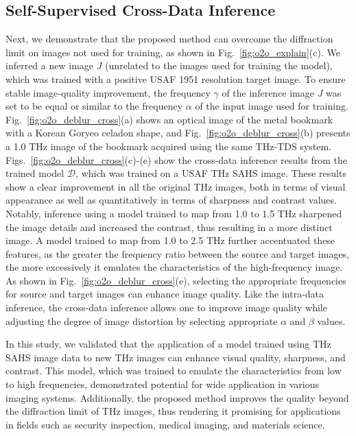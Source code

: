 \subsection{Self-Supervised Cross-Data Inference}
Next, we demonstrate that the proposed method can overcome the diffraction limit on images not used for training, as shown in Fig.~\ref{fig:o2o_explain}(c).
We inferred a new image $J$ (unrelated to the images used for training the model), which was trained with a positive USAF 1951 resolution target image. 
To ensure stable image-quality improvement, the frequency $\gamma$ of the inference image $J$ was set to be equal or similar to the frequency $\alpha$ of the input image used for training.
Fig.~\ref{fig:o2o_deblur_cross}(a) shows an optical image of the metal bookmark with a Korean Goryeo celadon shape, and Fig.~\ref{fig:o2o_deblur_cross}(b) presents a 1.0 THz image of the bookmark acquired using the same THz-TDS system. Figs.~\ref{fig:o2o_deblur_cross}(c)-(e) show the cross-data inference results from the trained model $\mathcal{D}$, which was trained on a USAF THz SAHS image. 
These results show a clear improvement in all the original THz images, both in terms of visual appearance as well as quantitatively in terms of sharpness and contrast values. Notably, inference using a model trained to map from 1.0 to 1.5 THz sharpened the image details and increased the contrast, thus resulting in a more distinct image. A model trained to map from 1.0 to 2.5 THz further accentuated these features, as the greater the frequency ratio between the source and target images, the more excessively it emulates the characteristics of the high-frequency image. As shown in Fig.~\ref{fig:o2o_deblur_cross}(e), selecting the appropriate frequencies for source and target images can enhance image quality. Like the intra-data inference, the cross-data inference allows one to improve image quality while adjusting the degree of image distortion by selecting appropriate $\alpha$ and $\beta$ values.

In this study, we validated that the application of a model trained using THz SAHS image data to new THz images can enhance visual quality, sharpness, and contrast. This model, which was trained to emulate the characteristics from low to high frequencies, demonstrated potential for wide application in various imaging systems. Additionally, the proposed method improves the quality beyond the diffraction limit of THz images, thus rendering it promising for applications in fields such as security inspection, medical imaging, and materials science.

